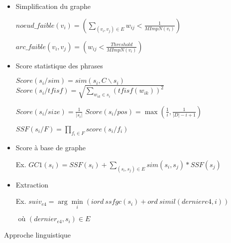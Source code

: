 \documentclass{KodeBook}
\begin{document}
\begin{itemize}
	\item Simplification du graphe
	
	\hspace{.5cm}$noeud\_faible(v_i) = ( \sum_{(v_i, v_j) \in E} w_{ij} < \frac{1}{MImpN(v_i)} )$ 
	
	\hspace{.5cm}$arc\_faible(v_i, v_j) = ( w_{ij} < \frac{Threshold}{MImpN(v_i)})$
	
	\item Score statistique des phrases
	
	\hspace{.5cm}$ Score(s_i/ sim) = sim(s_i, C\backslash s_i) $
	$Score(s_i/ tfisf) = \sqrt{\sum\limits_{w_{ik} \in s_i} (tfisf(w_{ik}))^2}$
	
	\hspace{.5cm}$Score(s_i/ size) = \frac{1}{|s_i|}$
	$Score(s_i/ pos) = \max (\frac{1}{i}, \frac{1}{|D| - i + 1})$
	
	\hspace{.5cm}$SSF(s_i/ F) = \prod_{f_i \in F} score(s_i/f_i)$
	
	\item Score à base de graphe 
	
	\hspace{.5cm}Ex. $GC1(s_i) = SSF(s_i) + \sum\limits_{(s_i, s_j) \in E} sim(s_i, s_j) * SSF(s_j)$
	
	\item Extraction
	
	\hspace{.5cm}Ex. $ suiv_{e4}  =  \arg\min\limits_i (iord\ ssfgc(s_i) + ord\ simil(dernier{e4}, i))$ 
	
	\hspace{3cm}$ \text{ où } (dernier_{e4}, s_i) \in E $
\end{itemize}

Approche linguistique
\end{document}

